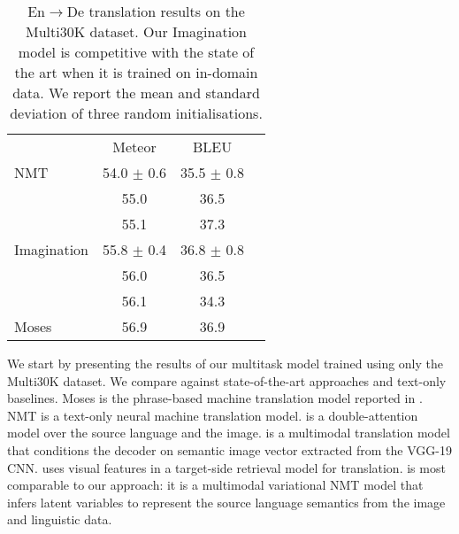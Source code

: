 
\begin{table}
\centering
\renewcommand{\arraystretch}{1.3}
\begin{tabular}{lccc}
\cmidrule[0.08em](l{5pt}r{5pt}){1-3}
& Meteor & BLEU \\
\cmidrule(l{5pt}r{5pt}){1-3}
NMT & 54.0 $\pm$ 0.6 & 35.5 $\pm$ 0.8\\
\cite{Calixto2017c} & 55.0 & 36.5 \\
\cite{Calixto2017b} & 55.1 & 37.3 \\
Imagination & 55.8 $\pm$ 0.4 & 36.8 $\pm$ 0.8\\
\cite{toyama2016neural} & 56.0  & 36.5 \\
\cite{Hitschler2016} & 56.1 & 34.3 \\
Moses & 56.9 & 36.9\\
\cmidrule[0.08em](l{5pt}r{5pt}){1-3}
\end{tabular}
\caption{En$\rightarrow$De translation results on the Multi30K dataset. Our Imagination model is competitive with the state of the art when it is trained on in-domain data. We report the mean and standard deviation of three random initialisations.}
\label{tab:results:in-domain}
\end{table}

We start by presenting the results of our multitask
model trained using only the Multi30K dataset. We compare against state-of-the-art approaches and text-only baselines. Moses is the phrase-based machine translation model \citep{Koehn2007} reported in \cite{Specia2016}. NMT is a text-only neural machine translation model.
\cite{Calixto2017c} is a double-attention model over the source language and the image.
\cite{Calixto2017b} is a multimodal translation model that conditions the decoder on semantic image vector extracted from the VGG-19 CNN.
\cite{Hitschler2016} uses visual features in a target-side retrieval model for translation. \cite{toyama2016neural} is most comparable to our approach: it is a multimodal variational NMT model that infers latent variables to represent the source language semantics from the image and linguistic data.

